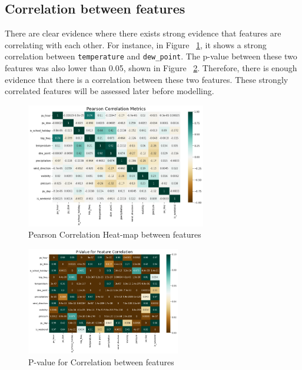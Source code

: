 \documentclass[11pt]{article}
\begin{document}
\subsection{Correlation between features}
There are clear evidence where there exists strong evidence that features are correlating with each other. For instance, in Figure ~\ref{fig:corr}, it shows a strong correlation between \texttt{temperature} and \texttt{dew\_point}. The p-value between these two features was also lower than 0.05, shown in Figure ~\ref{fig:corr_pval}. Therefore, there is enough evidence that there is a correlation between these two features. These strongly correlated features will be assessed later before modelling.
\begin{figure}[h]
    \includegraphics[width=0.7\textwidth]{plots/corr_heatmap.png}
    \centering
    \caption{Pearson Correlation Heat-map between features}
    \label{fig:corr}
\end{figure}
\begin{figure}[h]
    \includegraphics[width=0.6\textwidth]{plots/pval_heatmap.png}
    \centering
    \caption{P-value for Correlation between features}
    \label{fig:corr_pval}
\end{figure}
\end{document}
